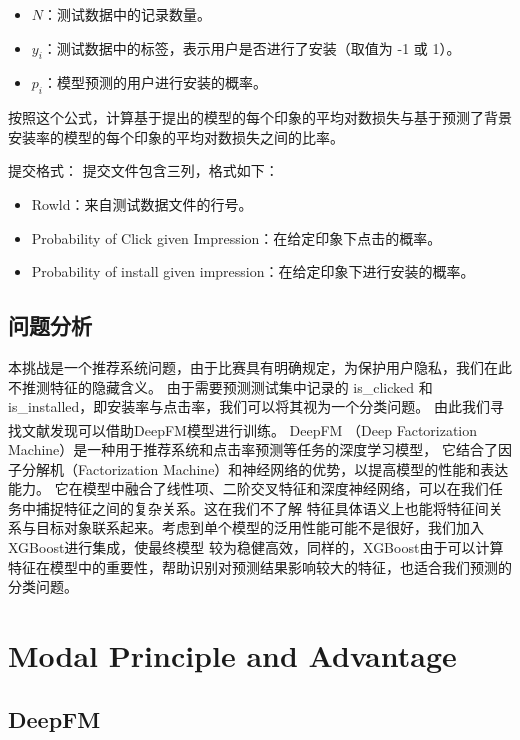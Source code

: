 \documentclass{article}
\newcommand{\upcite}[1]{\textsuperscript{\cite{#1}}}
\begin{document}
\begin{itemize}
  \item $N$：测试数据中的记录数量。
  \item $y_i$：测试数据中的标签，表示用户是否进行了安装（取值为 -1 或 1）。
  \item $p_i$：模型预测的用户进行安装的概率。
\end{itemize}

按照这个公式，计算基于提出的模型的每个印象的平均对数损失与基于预测了背景安装率的模型的每个印象的平均对数损失之间的比率。

提交格式： 提交文件包含三列，格式如下：

\begin{itemize}
  \item Rowld：来自测试数据文件的行号。
  \item Probability of Click given Impression：在给定印象下点击的概率。
  \item Probability of install given impression：在给定印象下进行安装的概率。
\end{itemize}

\subsection{问题分析}
本挑战是一个推荐系统问题，由于比赛具有明确规定，为保护用户隐私，我们在此不推测特征的隐藏含义。
由于需要预测测试集中记录的 is\_clicked 和 is\_installed，即安装率与点击率，我们可以将其视为一个分类问题。
由此我们寻找文献发现可以借助DeepFM模型进行训练。
DeepFM \upcite{2017arXiv170304247G}（Deep Factorization Machine）是一种用于推荐系统和点击率预测等任务的深度学习模型，
它结合了因子分解机（Factorization Machine）和神经网络的优势，以提高模型的性能和表达能力。
它在模型中融合了线性项、二阶交叉特征和深度神经网络，可以在我们任务中捕捉特征之间的复杂关系。这在我们不了解
特征具体语义上也能将特征间关系与目标对象联系起来。考虑到单个模型的泛用性能可能不是很好，我们加入XGBoost进行集成，使最终模型
较为稳健高效，同样的，XGBoost由于可以计算特征在模型中的重要性，帮助识别对预测结果影响较大的特征，也适合我们预测的分类问题。

\section{Modal Principle and Advantage}

\subsection{DeepFM}
\end{document}
